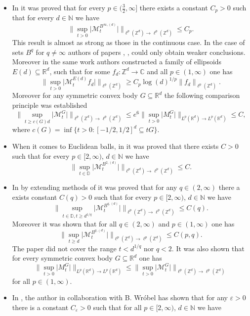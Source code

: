 \documentclass[a4paper,oneside, reqno]{amsart}
\numberwithin{equation}{section}
\theoremstyle{definition}%
\theoremstyle{definition}
\theoremstyle{definition}%
\theoremstyle{definition}
\newcommand{\Z}{\mathbb{Z}}
\newcommand{\R}{\mathbb{R}}
\newcommand{\C}{\mathbb{C}}
\newcommand{\D}{\mathbb{D}}
\newcommand{\N}{\mathbb{N}}
\begin{document}
\begin{itemize}
    \item In \cite{cubes} it was proved that for every $p \in ( \frac{3}{2}, \infty ]$ there exists a constant $C_p>0$ such that for every $d \in \N$ we have
    \[
    \Big\| \sup_{t>0} \big|\mathcal{M}_t^{B^{\infty,(d)}}\big| \Big\|_{\ell^p(\Z ^d) \to \ell^p(\Z ^d)} \leq C_p .
    \]
    This result is almost as strong as those in the continuous case. In the case of sets $B^q$ for $q \neq \infty$ authors of papers \cite{cubes}, \cite{balls}, \cite{KMPW}  could only obtain weaker conclusions. Moreover in the same work authors constructed a family of ellipsoids $E(d) \subseteq \R^d$, such that for some $f_d : \Z^d \to \C$ and all $p \in (1, \infty)$ one has 
    \[
     \Big\| \sup_{t>0} \big| \mathcal{M}_t^{E(d)} f_d \big| \Big\|_{\ell^p(\Z^d)} \ge C_p \log(d)^{1/p} \|f_d \|_{\ell^p(\Z^d)}.
    \]
    Moreover for any symmetric convex body $G \subseteq \R^d$ the following comparison principle was established
    \[
    \Big\| \sup_{t \ge c(G) d} \big| \mathcal{M}_t^G  \big| \Big\|_{\ell^p(\Z^d) \to \ell^p(\Z^d)} \le e^6 \Big\| \sup_{t>0} \big|M_t^G\big| \Big\|_{L^p(\R^d) \to L^p(\R^d) } \le C,
    \]
    where $c(G)= \inf\{t>0: [-1/2,1/2]^d \subseteq tG \}$.
    \item When it comes to Euclidean balls, in \cite{balls} it was proved that there exists $C>0$ such that for every $p \in [2, \infty)$, $d \in \N$ we have
    \[
    \Big\| \sup_{t \in \D} \big|\mathcal{M}_t^{B^{2,(d)}} \big| \Big\|_{\ell^p(\Z ^d) \to \ell^p(\Z ^d)} \leq C.
    \]
    \item In \cite{KMPW} by extending methods of \cite{balls}  it was proved that for any $q \in (2, \infty)$ there a exists constant $C(q)>0$ 
    such that for every $p \in [2, \infty)$, $d \in \N$ we have
    \[
    \Big\| \sup_{t \in \D, t \geq d^{1/q}} \big|\mathcal{M}_t^{B^{q,(d)}} \big| \Big\|_{\ell^p(\Z ^d) \to \ell^p(\Z ^d)} \leq C(q).
    \]
    Moreover it was shown that for all $q \in (2, \infty)$ and $p \in (1, \infty)$ one has 
    \[
    \Big\| \sup_{t \ge d} \big|\mathcal{M}_t^{B^{q,(d)}} \big| \Big\|_{\ell^p(\Z ^d) \to \ell^p(\Z ^d)} \leq C(p,q).
    \]
    The paper \cite{KMPW} did not cover the range $t<d^{1/q}$ nor $q<2$.
    It was also shown that for every symmetric convex body $G \subseteq \R^d$ one has
    \[
    \Big\| \sup_{t>0}\big|M_t^G\big| \Big\|_{L^p(\R^d) \to L^p(\R^d)} \le \Big\| \sup_{t>0}\big|\mathcal{M}_t^G\big| \Big\|_{\ell^p(\Z^d) \to \ell^p(\Z^d) }
    \]
    for all $p \in (1, \infty)$.
    \item  In \cite{NW}, the author in collaboration with B. Wróbel has shown that for any $\varepsilon>0$ there is a constant $C_{\varepsilon}>0$ such that for all $p \in [2,\infty)$, $d \in \N$ we have

\end{itemize}
\end{document}
